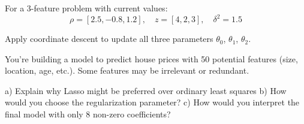 \documentclass{article}
\newcounter{exercise}
\begin{document}
\begin{tcolorbox}[colback=gray!5!white,colframe=gray!75!black,title=Problem \stepcounter{exercise}: Multi-dimensional Soft Thresholding]

For a 3-feature problem with current values:
$$\rho = [2.5, -0.8, 1.2], \quad z = [4, 2, 3], \quad \delta^2 = 1.5$$

Apply coordinate descent to update all three parameters $\theta_0$, $\theta_1$, $\theta_2$.
\end{tcolorbox}

\begin{tcolorbox}[colback=gray!5!white,colframe=gray!75!black,title=Problem \stepcounter{exercise}: Real-world Application]

You're building a model to predict house prices with 50 potential features (size, location, age, etc.). Some features may be irrelevant or redundant. 

a) Explain why Lasso might be preferred over ordinary least squares
b) How would you choose the regularization parameter?
c) How would you interpret the final model with only 8 non-zero coefficients?
\end{tcolorbox}
\end{document}
